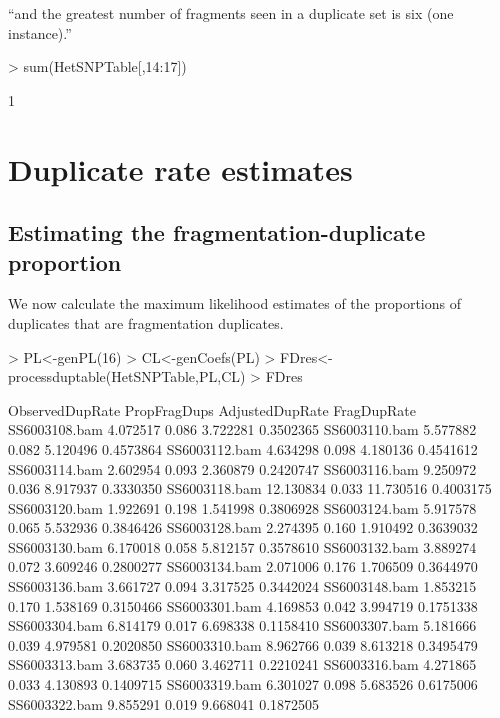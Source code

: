 \documentclass{article}
\begin{document}
``and the greatest number of fragments seen in a duplicate set is six (one instance).''
\begin{Schunk}
\begin{Sinput}
> sum(HetSNPTable[,14:17])
\end{Sinput}
\begin{Soutput}
[1] 1
\end{Soutput}
\end{Schunk}

\clearpage{}

\section{Duplicate rate estimates}
\label{sec:Estimates}

\subsection{Estimating the fragmentation-duplicate proportion}


We now calculate the maximum likelihood estimates of the proportions of duplicates that are fragmentation duplicates.

\begin{Schunk}
\begin{Sinput}
> PL<-genPL(16)
> CL<-genCoefs(PL)
> FDres<-processduptable(HetSNPTable,PL,CL)
> FDres
\end{Sinput}
\begin{Soutput}
              ObservedDupRate PropFragDups AdjustedDupRate FragDupRate
SS6003108.bam        4.072517        0.086        3.722281   0.3502365
SS6003110.bam        5.577882        0.082        5.120496   0.4573864
SS6003112.bam        4.634298        0.098        4.180136   0.4541612
SS6003114.bam        2.602954        0.093        2.360879   0.2420747
SS6003116.bam        9.250972        0.036        8.917937   0.3330350
SS6003118.bam       12.130834        0.033       11.730516   0.4003175
SS6003120.bam        1.922691        0.198        1.541998   0.3806928
SS6003124.bam        5.917578        0.065        5.532936   0.3846426
SS6003128.bam        2.274395        0.160        1.910492   0.3639032
SS6003130.bam        6.170018        0.058        5.812157   0.3578610
SS6003132.bam        3.889274        0.072        3.609246   0.2800277
SS6003134.bam        2.071006        0.176        1.706509   0.3644970
SS6003136.bam        3.661727        0.094        3.317525   0.3442024
SS6003148.bam        1.853215        0.170        1.538169   0.3150466
SS6003301.bam        4.169853        0.042        3.994719   0.1751338
SS6003304.bam        6.814179        0.017        6.698338   0.1158410
SS6003307.bam        5.181666        0.039        4.979581   0.2020850
SS6003310.bam        8.962766        0.039        8.613218   0.3495479
SS6003313.bam        3.683735        0.060        3.462711   0.2210241
SS6003316.bam        4.271865        0.033        4.130893   0.1409715
SS6003319.bam        6.301027        0.098        5.683526   0.6175006
SS6003322.bam        9.855291        0.019        9.668041   0.1872505
\end{Soutput}
\end{Schunk}
\end{document}
